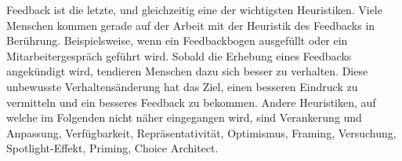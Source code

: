 Feedback ist die letzte, und gleichzeitig eine der wichtigsten Heuristiken. Viele Menschen kommen gerade auf der Arbeit mit der Heuristik des Feedbacks in Berührung. Beispielsweise, wenn ein Feedbackbogen ausgefüllt oder ein Mitarbeitergespräch geführt wird. Sobald die Erhebung eines Feedbacks angekündigt wird, tendieren Menschen dazu sich besser zu verhalten. Diese unbewusste Verhaltensänderung hat das Ziel, einen besseren Eindruck zu vermitteln und ein besseres Feedback zu bekommen. 
Andere Heuristiken, auf welche im Folgenden nicht näher eingegangen wird, sind Verankerung und Anpassung, Verfügbarkeit, Repräsentativität, Optimismus, Framing, Versuchung, Spotlight-Effekt, Priming, Choice Architect.
